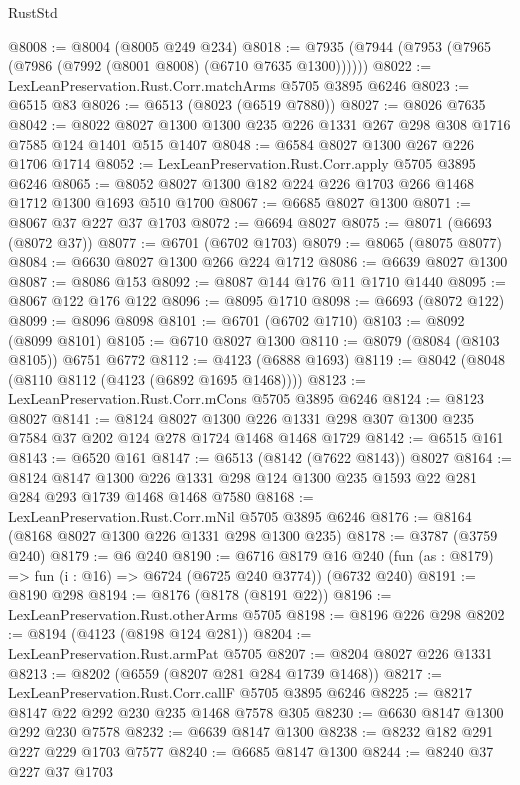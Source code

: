 \begin{lexlean}{RustStd}
\begin{coremodule}
@8008 := @8004 (@8005 @249 @234)
@8018 := @7935 (@7944 (@7953 (@7965 (@7986 (@7992 (@8001 @8008) (@6710 @7635 @1300))))))
@8022 := LexLeanPreservation.Rust.Corr.matchArms @5705 @3895 @6246
@8023 := @6515 @83
@8026 := @6513 (@8023 (@6519 @7880))
@8027 := @8026 @7635
@8042 := @8022 @8027 @1300 @1300 @235 @226 @1331 @267 @298 @308 @1716 @7585 @124 @1401 @515 @1407
@8048 := @6584 @8027 @1300 @267 @226 @1706 @1714
@8052 := LexLeanPreservation.Rust.Corr.apply @5705 @3895 @6246
@8065 := @8052 @8027 @1300 @182 @224 @226 @1703 @266 @1468 @1712 @1300 @1693 @510 @1700
@8067 := @6685 @8027 @1300
@8071 := @8067 @37 @227 @37 @1703
@8072 := @6694 @8027
@8075 := @8071 (@6693 (@8072 @37))
@8077 := @6701 (@6702 @1703)
@8079 := @8065 (@8075 @8077)
@8084 := @6630 @8027 @1300 @266 @224 @1712
@8086 := @6639 @8027 @1300
@8087 := @8086 @153
@8092 := @8087 @144 @176 @11 @1710 @1440
@8095 := @8067 @122 @176 @122
@8096 := @8095 @1710
@8098 := @6693 (@8072 @122)
@8099 := @8096 @8098
@8101 := @6701 (@6702 @1710)
@8103 := @8092 (@8099 @8101)
@8105 := @6710 @8027 @1300
@8110 := @8079 (@8084 (@8103 @8105)) @6751 @6772
@8112 := @4123 (@6888 @1693)
@8119 := @8042 (@8048 (@8110 @8112 (@4123 (@6892 @1695 @1468))))
@8123 := LexLeanPreservation.Rust.Corr.mCons @5705 @3895 @6246
@8124 := @8123 @8027
@8141 := @8124
    @8027
    @1300
    @226
    @1331
    @298
    @307
    @1300
    @235
    @7584
    @37
    @202
    @124
    @278
    @1724
    @1468
    @1468
    @1729
@8142 := @6515 @161
@8143 := @6520 @161
@8147 := @6513 (@8142 (@7622 @8143)) @8027
@8164 := @8124
    @8147
    @1300
    @226
    @1331
    @298
    @124
    @1300
    @235
    @1593
    @22
    @281
    @284
    @293
    @1739
    @1468
    @1468
    @7580
@8168 := LexLeanPreservation.Rust.Corr.mNil @5705 @3895 @6246
@8176 := @8164 (@8168 @8027 @1300 @226 @1331 @298 @1300 @235)
@8178 := @3787 (@3759 @240)
@8179 := @6 @240
@8190 := @6716
    @8179
    @16
    @240
    (fun (as : @8179) => fun (i : @16) => @6724 (@6725 @240 @3774))
    (@6732 @240)
@8191 := @8190 @298
@8194 := @8176 (@8178 (@8191 @22))
@8196 := LexLeanPreservation.Rust.otherArms @5705
@8198 := @8196 @226 @298
@8202 := @8194 (@4123 (@8198 @124 @281))
@8204 := LexLeanPreservation.Rust.armPat @5705
@8207 := @8204 @8027 @226 @1331
@8213 := @8202 (@6559 (@8207 @281 @284 @1739 @1468))
@8217 := LexLeanPreservation.Rust.Corr.callF @5705 @3895 @6246
@8225 := @8217 @8147 @22 @292 @230 @235 @1468 @7578 @305
@8230 := @6630 @8147 @1300 @292 @230 @7578
@8232 := @6639 @8147 @1300
@8238 := @8232 @182 @291 @227 @229 @1703 @7577
@8240 := @6685 @8147 @1300
@8244 := @8240 @37 @227 @37 @1703

\end{coremodule}
\end{lexlean}
